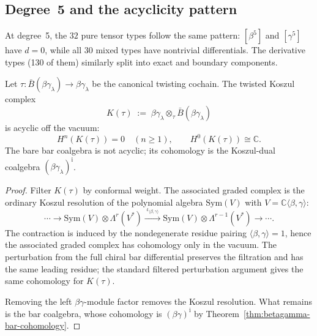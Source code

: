 \subsection{Degree~5 and the acyclicity pattern}

At degree~5, the $32$ pure tensor types follow the same pattern:
$[\beta^5]$ and $[\gamma^5]$ have $d = 0$, while all $30$ mixed
types have nontrivial differentials. The derivative types (130 of
them) similarly split into exact and boundary components.

\begin{proposition}
\label{prop:betagamma-bar-acyclicity}
Let $\tau\colon \bar B(\beta\gamma_\lambda)\to\beta\gamma_\lambda$
be the canonical twisting cochain. The twisted Koszul complex
\[
K(\tau)
\;:=\;
\beta\gamma_\lambda\otimes_\tau\bar B(\beta\gamma_\lambda)
\]
is acyclic off the vacuum:
\[
H^n(K(\tau))=0\quad(n\ge1),\qquad H^0(K(\tau))\cong\mathbb C.
\]
The bare bar coalgebra is not acyclic; its cohomology is the
Koszul-dual coalgebra $(\beta\gamma_\lambda)^{\mathrm i}$.
\end{proposition}

\begin{proof}
Filter $K(\tau)$ by conformal weight. The associated graded complex is
the ordinary Koszul resolution of the polynomial algebra
$\mathrm{Sym}(V)$ with $V=\mathbb C\langle\beta,\gamma\rangle$:
\[
\cdots \longrightarrow
\mathrm{Sym}(V)\otimes \Lambda^r(V^*)
\xrightarrow{\;\iota_{\langle\beta,\gamma\rangle}\;}
\mathrm{Sym}(V)\otimes \Lambda^{r-1}(V^*)
\longrightarrow \cdots .
\]
The contraction is induced by the nondegenerate residue pairing
$\langle\beta,\gamma\rangle=1$, hence the associated graded complex
has cohomology only in the vacuum. The perturbation from the full
chiral bar differential preserves the filtration and has the same
leading residue; the standard filtered perturbation argument gives
the same cohomology for $K(\tau)$.

Removing the left $\beta\gamma$-module factor removes the Koszul
resolution. What remains is the bar coalgebra, whose cohomology is
$(\beta\gamma)^{\mathrm i}$ by
Theorem~\ref{thm:betagamma-bar-cohomology}.\qedhere
\end{proof}


